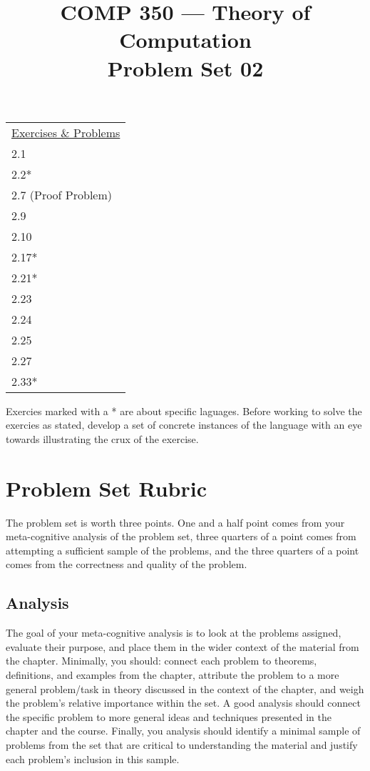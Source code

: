 \documentclass[nobib]{tufte-handout}
\title{COMP 350 --- Theory of Computation \\ Problem Set 02}
\begin{document}
\maketitle

\begin{center}
\begin{tabular}{l}
  \underline{Exercises \& Problems} \\
  2.1 \\
  2.2* \\
  2.7 (Proof Problem)\\
  2.9 \\
  2.10 \\
  2.17* \\
  2.21* \\
  2.23 \\
  2.24 \\
  2.25 \\
  2.27 \\
  2.33*
\end{tabular}
\end{center}

Exercies marked with a * are about specific laguages. Before working to solve the exercies as stated, develop a set of concrete instances of the language with an eye towards illustrating the crux of the exercise. 

\section*{Problem Set Rubric}

The problem set is worth three points.  One and a half point comes from your meta-cognitive analysis of the problem set, three quarters of a point comes from attempting a sufficient sample of the problems, and the three quarters of a point comes from the correctness and quality of the problem.

\subsection*{Analysis}

The goal of your meta-cognitive analysis is to look at the problems assigned, evaluate their purpose, and place them in the wider context of the material from the chapter. Minimally, you should: connect each problem to theorems, definitions, and examples from the chapter, attribute the problem to a more general problem/task in theory discussed in the context of the chapter, and weigh the problem's relative importance within the set. A good analysis should connect the specific problem to more general ideas and techniques presented in the chapter and the course. Finally, you analysis should identify a minimal sample of problems from the set that are critical to understanding the material and justify each problem's inclusion in this sample.
\end{document}
